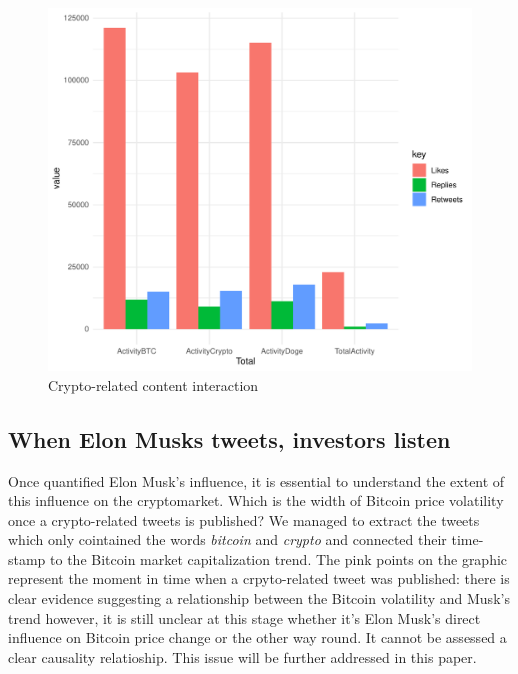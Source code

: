 \documentclass[
]{article}
\begin{document}
\begin{figure}
\centering
\includegraphics{Trial1_files/figure-latex/fig2-1.pdf}
\caption{\label{fig:fig2}Crypto-related content interaction}
\end{figure}

\hypertarget{when-elon-musks-tweets-investors-listen}{%
\subsection{When Elon Musks tweets, investors
listen}\label{when-elon-musks-tweets-investors-listen}}

Once quantified Elon Musk's influence, it is essential to understand the
extent of this influence on the cryptomarket. Which is the width of
Bitcoin price volatility once a crypto-related tweets is published? We
managed to extract the tweets which only cointained the words
\emph{bitcoin} and \emph{crypto} and connected their time-stamp to the
Bitcoin market capitalization trend. The pink points on the graphic
represent the moment in time when a crpyto-related tweet was published:
there is clear evidence suggesting a relationship between the Bitcoin
volatility and Musk's trend however, it is still unclear at this stage
whether it's Elon Musk's direct influence on Bitcoin price change or the
other way round. It cannot be assessed a clear causality relatioship.
This issue will be further addressed in this paper.
\end{document}

